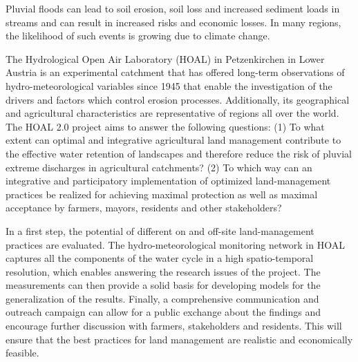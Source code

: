 \noindent

Pluvial floods can lead to soil erosion, soil loss and increased sediment loads in streams and can result in increased risks and economic losses. In many regions, the likelihood of such events is growing due to climate change.

The Hydrological Open Air Laboratory (HOAL) in Petzenkirchen in Lower Austria is an experimental catchment that has offered long-term observations of hydro-meteorological variables since 1945 that enable the investigation of the drivers and factors which control erosion processes. Additionally, its geographical and agricultural characteristics are representative of regions all over the world. The HOAL 2.0 project aims to answer the following questions: (1) To what extent can optimal and integrative agricultural land management contribute to the effective water retention of landscapes and therefore reduce the risk of pluvial extreme discharges in agricultural catchments? (2) To which way can an integrative and participatory implementation of optimized land-management practices be realized for achieving maximal protection as well as maximal acceptance by farmers, mayors, residents and other stakeholders?

In a first step, the potential of different on and off-site land-management practices are evaluated. The hydro-meteorological monitoring network in HOAL captures all the components of the water cycle in a high spatio-temporal resolution, which enables answering the research issues of the project. The measurements can then provide a solid basis for developing models for the generalization of the results. Finally, a comprehensive communication and outreach campaign can allow for a public exchange about the findings and encourage further discussion with farmers, stakeholders and residents. This will ensure that the best practices for land management are realistic and economically feasible.
\newpage{}
{}
\begin{flushleft}





\end{flushleft}

